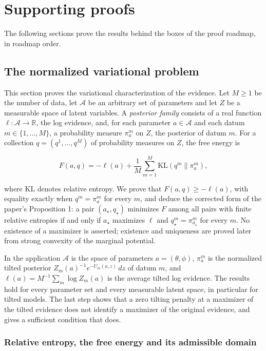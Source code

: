 \documentclass[11pt,a4paper]{report}
\begin{document}
\chapter{Supporting proofs}
The following sections prove the results behind the boxes of the proof roadmap, in roadmap order.

\section{\texorpdfstring{The normalized variational problem}{The normalized variational problem}}


This section proves the variational characterization of the evidence. Let \(M\ge1\) be the number of data, let \(\mathcal A\) be an arbitrary set of parameters and let \(Z\) be a measurable space of latent variables. A \emph{posterior family} consists of a real function \(\ell:\mathcal A\to\mathbb R\), the log evidence, and, for each parameter \(a\in\mathcal A\) and each datum \(m\in\{1,\dots,M\}\), a probability measure \(\pi_a^m\) on \(Z\), the posterior of datum \(m\). For a collection \(q=(q^1,\dots,q^M)\) of probability measures on \(Z\), the free energy is


\[F(a,q)=-\ell(a)+\frac1M\sum_{m=1}^M\mathrm{KL}(q^m\|\pi_a^m),\]


where \(\mathrm{KL}\) denotes relative entropy. We prove that \(F(a,q)\ge-\ell(a)\), with equality exactly when \(q^m=\pi_a^m\) for every \(m\), and deduce the corrected form of the paper's Proposition 1: a pair \((a_\star,q_\star)\) minimizes \(F\) among all pairs with finite relative entropies if and only if \(a_\star\) maximizes \(\ell\) and \(q_\star^m=\pi_{a_\star}^m\) for every \(m\). No existence of a maximizer is asserted; existence and uniqueness are proved later from strong convexity of the marginal potential.




In the application \(\mathcal A\) is the space of parameters \(a=(\theta,\phi)\), \(\pi_a^m\) is the normalized tilted posterior \(Z_m(a)^{-1}e^{-U_m(a,z)}\,dz\) of datum \(m\), and \(\ell(a)=M^{-1}\sum_m\log Z_m(a)\) is the average tilted log evidence. The results hold for every parameter set and every measurable latent space, in particular for tilted models. The last step shows that a zero tilting penalty at a maximizer of the tilted evidence does not identify a maximizer of the original evidence, and gives a sufficient condition that does.

\subsection{\texorpdfstring{Relative entropy, the free energy and its admissible domain}{Relative entropy, the free energy and its admissible domain}}
\end{document}
